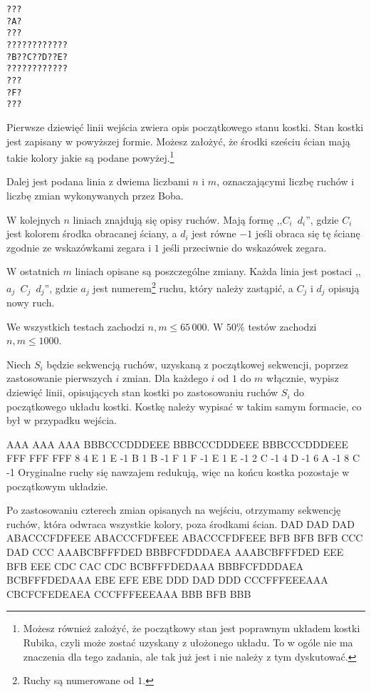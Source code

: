 \noindent
\texttt{???} \\
\texttt{?A?} \\
\texttt{???} \\
\texttt{????????????} \\
\texttt{?B??C??D??E?} \\
\texttt{????????????} \\
\texttt{???} \\
\texttt{?F?} \\
\texttt{???} \\


Pierwsze dziewięć linii wejścia zwiera opis początkowego stanu kostki.
Stan kostki jest zapisany w powyższej formie.
Możesz założyć, że środki sześciu ścian mają takie kolory jakie są podane
	powyżej.\footnote{Możesz również założyć, że początkowy stan jest poprawnym układem kostki Rubika,
		czyli może zostać uzyskany z ułożonego układu.
		To w ogóle nie ma znaczenia dla tego zadania, ale tak już jest i nie należy z tym dyskutować.}

Dalej jest podana linia z dwiema liczbami $n$ i $m$, oznaczającymi liczbę ruchów i liczbę zmian wykonywanych przez Boba.

W kolejnych $n$ liniach znajdują się opisy ruchów.
Mają formę ,,\texttt{$C_i$ $d_i$}'', gdzie $C_i$ jest kolorem środka obracanej ściany, a $d_i$ jest równe $-1$
	jeśli obraca się tę ścianę zgodnie ze wskazówkami zegara i $1$ jeśli przeciwnie do wskazówek zegara.

W ostatnich $m$ liniach opisane są poszczególne zmiany.
Każda linia jest postaci ,,\texttt{$a_j$ $C_j$ $d_j$}'', gdzie $a_j$ jest numerem\footnote{Ruchy są numerowane od $1$.}
	ruchu, który należy zastąpić, a $C_j$ i $d_j$ opisują nowy ruch.

We wszystkich testach zachodzi $n, m \le 65\,000$.
W $50\%$ testów zachodzi $n, m \le 1000$.

\newpage


Niech $S_i$ będzie sekwencją ruchów, uzyskaną z początkowej sekwencji, poprzez zastosowanie pierwszych $i$ zmian.
Dla każdego $i$ od $1$ do $m$ włącznie, wypisz dziewięć linii, opisujących stan kostki po zastosowaniu
	ruchów $S_i$ do początkowego układu kostki.
Kostkę należy wypisać w takim samym formacie, co był w przypadku wejścia.


\sampleIN
AAA
AAA
AAA
BBBCCCDDDEEE
BBBCCCDDDEEE
BBBCCCDDDEEE
FFF
FFF
FFF
8 4
E 1
E -1
B 1
B -1
F 1
F -1
E 1
E -1
2 C -1
4 D -1
6 A -1
8 C -1
\sampleCOMMENT
Oryginalne ruchy się nawzajem redukują, więc na końcu kostka pozostaje w początkowym układzie.

\vspace{0.2cm}

Po zastosowaniu czterech zmian opisanych na wejściu,
	otrzymamy sekwencję ruchów, która odwraca wszystkie kolory, poza środkami ścian.
\sampleOUT
DAD
DAD
DAD
ABACCCFDFEEE
ABACCCFDFEEE
ABACCCFDFEEE
BFB
BFB
BFB
CCC
DAD
CCC
AAABCBFFFDED
BBBFCFDDDAEA
AAABCBFFFDED
EEE
BFB
EEE
CDC
CAC
CDC
BCBFFFDEDAAA
BBBFCFDDDAEA
BCBFFFDEDAAA
EBE
EFE
EBE
DDD
DAD
DDD
CCCFFFEEEAAA
CBCFCFEDEAEA
CCCFFFEEEAAA
BBB
BFB
BBB
\sampleEND


